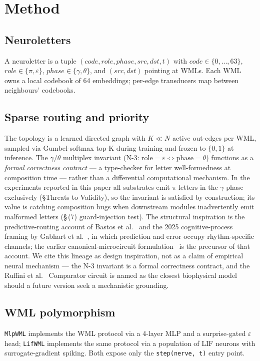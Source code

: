\documentclass[10pt,twocolumn]{article}
\begin{document}
\section{Method}
\label{sec:method}

\subsection{Neuroletters}
A neuroletter is a tuple $(code, role, phase, src, dst, t)$ with
$code \in \{0, \dots, 63\}$, $role \in \{\pi, \varepsilon\}$,
$phase \in \{\gamma, \theta\}$, and $(src, dst)$ pointing at WMLs.
Each WML owns a local codebook of 64 embeddings; per-edge
transducers map between neighbours' codebooks.

\subsection{Sparse routing and priority}
The topology is a learned directed graph with $K \ll N$ active
out-edges per WML, sampled via Gumbel-softmax top-K during training
and frozen to $\{0, 1\}$ at inference. The $\gamma / \theta$ multiplex
invariant (N-3: $\text{role}{=}\varepsilon \Leftrightarrow
\text{phase}{=}\theta$) functions as a \emph{formal correctness
contract} --- a type-checker for letter well-formedness at
composition time --- rather than a differential computational
mechanism. In the experiments reported in this paper all substrates emit $\pi$
letters in the $\gamma$ phase exclusively (\S Threats to Validity), so
the invariant is satisfied by construction; its value is catching
composition bugs when downstream modules inadvertently emit malformed
letters (\S\,(7) guard-injection test). The structural inspiration is
the predictive-routing account of Bastos et
al.~\cite{bastos2020routing} and the 2025 cognitive-process framing by Gabhart et al.~\cite{gabhart2025predictive}, in
which prediction and error occupy rhythm-specific channels; the earlier
canonical-microcircuit formulation~\cite{bastos2012canonical} is the
precursor of that account. We cite this lineage as design inspiration,
not as a claim of empirical neural mechanism --- the N-3 invariant is a
formal correctness contract, and the Ruffini et
al.~\cite{ruffini2025comparator} Comparator circuit is named as the
closest biophysical model should a future version seek a mechanistic
grounding.

\subsection{WML polymorphism}
\texttt{MlpWML} implements the WML protocol via a 4-layer MLP and
a surprise-gated $\varepsilon$ head; \texttt{LifWML} implements the
same protocol via a population of LIF neurons with surrogate-gradient
spiking. Both expose only the \texttt{step(nerve, t)} entry point.
\end{document}
